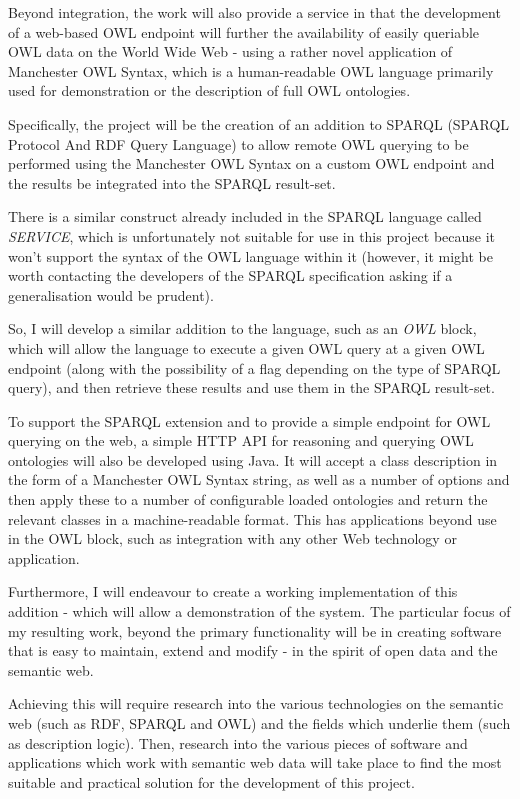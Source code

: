 \documentclass{article}
\begin{document}
Beyond integration, the work will also provide a service in that the development
of a web-based OWL endpoint will further the availability of easily queriable
OWL data on the World Wide Web - using a rather novel application of Manchester
OWL Syntax, which is a human-readable OWL language primarily used for
demonstration or the description of full OWL ontologies.\cite{manchesterowl}

Specifically, the project will be the creation of an addition to
SPARQL\cite{sparql} (SPARQL Protocol And RDF Query Language) to allow remote
OWL\cite{owlprimer} querying to be performed using the Manchester OWL Syntax 
on a custom OWL endpoint and the results be integrated into the SPARQL result-set.

There is a similar construct already included in the SPARQL language called
\emph{SERVICE}\cite{sservice}, which is unfortunately not suitable for use in this project
because it won't support the syntax of the OWL language within it (however, it
might be worth contacting the developers of the SPARQL specification asking if a
generalisation would be prudent).

So, I will develop a similar addition to the language, such as an \emph{OWL}
block, which will allow the language to execute a given OWL query at a given
OWL endpoint (along with the possibility of a flag depending on the type of
SPARQL query), and then retrieve these results and use them in the SPARQL
result-set.

To support the SPARQL extension and to provide a simple endpoint for OWL
querying on the web, a simple HTTP API for reasoning and querying OWL ontologies
will also be developed using Java. It will accept a class description in the
form of a Manchester OWL Syntax string, as well as a number of options and then
apply these to a number of configurable loaded ontologies and return the
relevant classes in a machine-readable format. This has applications beyond use
in the OWL block, such as integration with any other Web technology or
application.

Furthermore, I will endeavour to create a working implementation of this
addition - which will allow a demonstration of the system. The particular 
focus of my resulting work, beyond the primary functionality
will be in creating software that is easy to maintain, extend and modify - in
the spirit of open data and the semantic web.

Achieving this will require research into the various technologies on the
semantic web (such as RDF, SPARQL and OWL) and the fields which underlie them
(such as description logic). Then, research into the various pieces of software
and applications which work with semantic web data will take place to find the
most suitable and practical solution for the development of this project.
\end{document}

